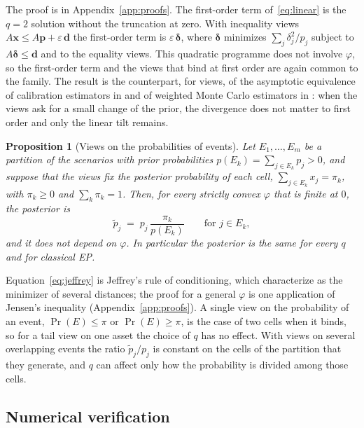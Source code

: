 \documentclass[11pt]{article}
\newtheorem{proposition}{Proposition}
\newcommand{\p}{\mathbf{p}}
\newcommand{\x}{\mathbf{x}}
\begin{document}
The proof is in Appendix~\ref{app:proofs}. The first-order term
of~\eqref{eq:linear} is the $q=2$ solution without the truncation at zero.
With inequality views $A\x \le A\p + \varepsilon\,\mathbf{d}$ the
first-order term is $\varepsilon\,\boldsymbol{\delta}$, where
$\boldsymbol{\delta}$ minimizes $\sum_j \delta_j^2/p_j$ subject to
$A\boldsymbol{\delta} \le \mathbf{d}$ and to the equality views. This
quadratic programme does not involve $\varphi$, so the first-order term
and the views that bind at first order are again common to the family. The result is the
counterpart, for views, of the asymptotic equivalence of calibration
estimators in \citet{DevilleSarndal1992} and of weighted Monte Carlo
estimators in \citet{GlassermanYu2005}: when the views ask for a small
change of the prior, the divergence does not matter to first order and only the linear tilt
remains.

\begin{proposition}[Views on the probabilities of events]\label{prop:jeffrey}
Let $E_1,\dots,E_m$ be a partition of the scenarios with prior
probabilities $p(E_k) = \sum_{j \in E_k} p_j > 0$, and suppose that the
views fix the posterior probability of each cell,
$\sum_{j \in E_k} x_j = \pi_k$, with $\pi_k \ge 0$ and $\sum_k \pi_k = 1$.
Then, for every strictly convex $\varphi$ that is finite at $0$, the
posterior is
\begin{equation}\label{eq:jeffrey}
\tilde p_j \;=\; p_j\, \frac{\pi_k}{p(E_k)} \qquad \text{for } j \in E_k,
\end{equation}
and it does not depend on $\varphi$. In particular the posterior is the same
for every $q$ and for classical EP.
\end{proposition}

Equation~\eqref{eq:jeffrey} is Jeffrey's rule of conditioning, which
\citet{DiaconisZabell1982} characterize as the minimizer of several
distances; the proof for a general $\varphi$ is one application of Jensen's
inequality (Appendix~\ref{app:proofs}). A single view on the probability of
an event, $\Pr(E) \le \pi$ or $\Pr(E) \ge \pi$, is the case of two cells
when it binds, so for a tail view on one asset the choice of $q$ has no
effect. With views on several overlapping events the ratio $\tilde p_j / p_j$ is
constant on the cells of the partition that they generate, and $q$ can
affect only how the probability is divided among those cells.

\subsection{Numerical verification}\label{sec:numerics}
\end{document}

